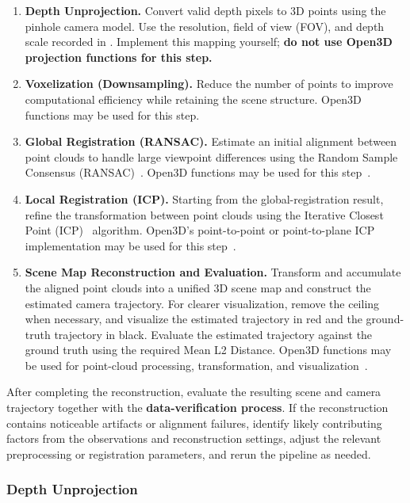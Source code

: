 \documentclass[11pt]{article}
\newcommand{\code}[1]{\texttt{\detokenize{#1}}}
\begin{document}
\begin{enumerate}
\item \textbf{Depth Unprojection.} Convert valid depth pixels to 3D points using the pinhole camera model. Use the resolution, field of view (FOV), and depth scale recorded in \code{intrinsics.json}. Implement this mapping yourself; \textbf{do not use Open3D projection functions
for this step.}
\item \textbf{Voxelization (Downsampling).} Reduce the number of points to improve computational efficiency while retaining the scene structure. Open3D functions may be used for this step\cite{open3dglobal}.
\item \textbf{Global Registration (RANSAC).} Estimate an initial alignment between point clouds to handle large viewpoint differences using the Random Sample Consensus (RANSAC)~\cite{fischler1981ransac}. Open3D functions may be used for this step~\cite{open3dglobal}.
\item \textbf{Local Registration (ICP).} Starting from the global-registration result, refine the transformation between
point clouds using the Iterative Closest Point (ICP)~\cite{chen1992object} algorithm. Open3D's point-to-point or point-to-plane ICP implementation may be used for this step~\cite{open3dglobal}.
\item \textbf{Scene Map Reconstruction and  Evaluation.} Transform and accumulate the aligned point clouds into a unified 3D scene map and construct the estimated camera trajectory. For clearer visualization, remove the ceiling when necessary, and visualize the estimated trajectory in red and the ground-truth trajectory in black. Evaluate the estimated trajectory against the ground truth using the required Mean L2 Distance. Open3D functions may be used for point-cloud processing, transformation, and visualization~\cite{open3dglobal}.
\end{enumerate}

After completing the reconstruction, evaluate the resulting scene and camera trajectory together with the \textbf{data-verification process}. If the reconstruction contains noticeable artifacts or alignment failures, identify likely contributing factors from the observations and reconstruction settings, adjust the relevant preprocessing or registration parameters, and rerun the pipeline as needed.

\subsubsection{Depth Unprojection}
\end{document}
